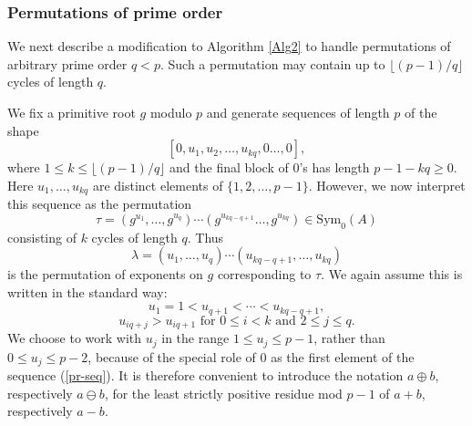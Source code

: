 \documentclass[letterpaper,12pt]{amsart}
\numberwithin{equation}{section}
\numberwithin{algorithm}{section}
\theoremstyle{definition}
\newcommand{\Symo}{\mathrm{Sym}_0}
\begin{document}
\subsubsection{Permutations of prime order}
We next describe a modification to Algorithm \ref{Alg2} to handle permutations of arbitrary prime order $q<p$. Such a permutation may contain up to $\lfloor (p-1)/q \rfloor$ cycles of length $q$. 

We fix a primitive root $g$ modulo $p$ and generate sequences of length $p$ of the shape 
\begin{equation}  \label{pr-seq}
 	[0,u_1, u_2, \ldots, u_{kq}, 0 \ldots, 0], 
 \end{equation}
 where $1 \leq k \leq \lfloor (p-1)/q \rfloor$ and the final block of $0$'s has length $p-1-kq \geq 0$. Here $u_1, \ldots, u_{kq}$ are distinct elements of $\{1, 2, \ldots, p-1\}$. However, we now interpret this sequence as the permutation 
 \begin{equation} \label{cyc-tau-perm}
 	  \tau = (g^{u_1}, \ldots, g^{u_q}) \cdots (g^{u_{kq-q+1}} \ldots , g^{u_{kq}}) \in \Symo(A) 
 \end{equation}
 consisting of $k$ cycles of length $q$. Thus
 \begin{equation} \label{lambda-perm} 
  \lambda = (u_1, \ldots, u_q) \cdots (u_{kq-q+1}, \ldots , u_{kq})
 \end{equation}
 is the permutation of exponents on $g$ corresponding to $\tau$. We again assume this is written in the standard way:
 \begin{equation} \label{q-first-in-ord}
 	u_1=1 < u_{q+1} < \cdots < u_{kq-q+1}, 
 \end{equation}
 \begin{equation} \label{q-cycles-in-ord}
 	u_{i q+j} > u_{i q +1} \mbox{ for } 0 \leq i < k \mbox{ and } 2 \leq j \leq q.
 \end{equation}
We choose to work with $u_j$ in the range $1 \leq u_j \leq p-1$, rather than $0 \leq u_j \leq p-2$, because of the special role of $0$ as the first element of the sequence (\ref{pr-seq}). It is therefore convenient to introduce the notation $a \oplus b$, respectively $a \ominus b$, for the least strictly positive residue mod $p-1$ of $a+b$, respectively $a-b$. 
 
\end{document}
